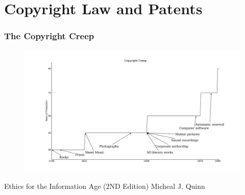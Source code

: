 \documentclass{beamer}
\begin{document}
\section{Copyright Law and Patents}
\label{sec:copyright_law_and_patents}

\begin{frame}[t]
	\frametitle{The Copyright Creep}
  \fontsize{6pt}{7.2}\selectfont
	\vspace{-8mm}
	\begin{center}
	\begin{figure}[hb]
	  \includegraphics[scale=.315]{copyright_creep.png}
	  \label{fig:copyright_creep}
	\end{figure}
	\end{center}
  Ethics for the Information Age (2ND Edition) Micheal J. Quinn
\end{frame}
\end{document}
